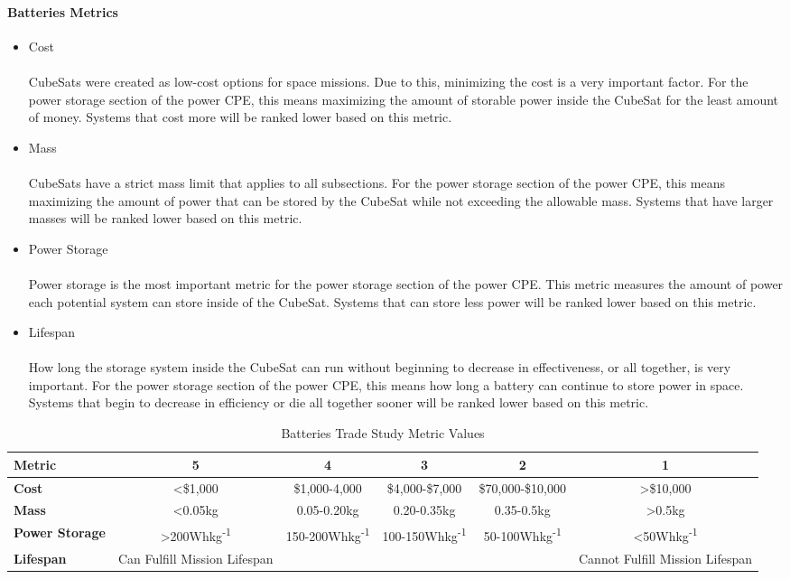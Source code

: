 \paragraph{Batteries Metrics}
\begin{itemize}
\item Cost\\
\\
CubeSats were created as low-cost options for space missions.  Due to this, minimizing the cost is a very important factor.  For the power storage section of the power CPE,  this means maximizing the amount of storable power inside the CubeSat for the least amount of money.  Systems that cost more will be ranked lower based on this metric.
\item{Mass} \\
\\
CubeSats have a strict mass limit that applies to all subsections.  For the power storage section of the power CPE, this means maximizing the amount of power that can be stored by the CubeSat while not exceeding the allowable mass.  Systems that have larger masses will be ranked lower based on this metric.
\item{Power Storage} \\
\\
Power storage is the most important metric for the power storage section of the power CPE.  This metric measures the amount of power each potential system can store inside of the CubeSat.  Systems that can store less power will be ranked lower based on this metric.
\item{Lifespan} \\
\\
How long the storage system inside the CubeSat can run without beginning to decrease in effectiveness, or all together, is very important.  For the power storage section of the power CPE, this means how long a battery can continue to store power in space.  Systems that begin to decrease in efficiency or die all together sooner will be ranked lower based on this metric.
\end{itemize}
\begin{table}[H]
\centering
\begin{tabular}{|l|c|c|c|c|c|} 
\hline
    \textbf{Metric} & \textbf{5} & \textbf{4} & \textbf{3} & \textbf{2} & \textbf{1}
    \\
\hline
    \textbf{Cost} & <\$1,000 & \$1,000-4,000 & \$4,000-\$7,000 & \$70,000-\$10,000 & >\$10,000 
    \\
\hline
    \textbf{Mass} & <0.05kg & 0.05-0.20kg & 0.20-0.35kg & 0.35-0.5kg & >0.5kg 
    \\    
\hline
    \textbf{Power Storage} & >200Whkg\textsuperscript{-1} & 150-200Whkg\textsuperscript{-1} & 100-150Whkg\textsuperscript{-1} & 50-100Whkg\textsuperscript{-1} & <50Whkg\textsuperscript{-1} 
    \\
\hline
    \textbf{Lifespan} &\multicolumn{1}{m{2.5cm}|}{Can Fulfill Mission Lifespan}& & & &\multicolumn{1}{m{3cm}|}{Cannot Fulfill Mission Lifespan}
    \\
\hline
\end{tabular}
\caption{Batteries Trade Study Metric Values}
\label{tbl:Batteries_Metric_Scores}
\end{table}

